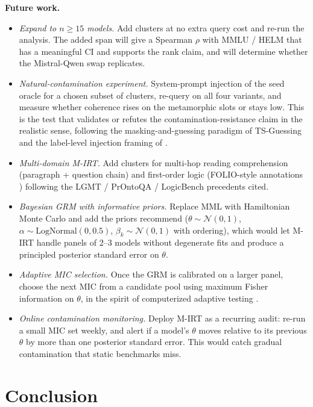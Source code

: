 \documentclass[11pt,letterpaper]{article}
\begin{document}
\textbf{Future work.}
\begin{itemize}
  \item \emph{Expand to $n \geq 15$ models.} Add clusters at no extra query cost and re-run the analysis. The added span will give a Spearman $\rho$ with MMLU / HELM that has a meaningful CI and supports the rank claim, and will determine whether the Mistral-Qwen swap replicates.
  \item \emph{Natural-contamination experiment.} System-prompt injection of the seed oracle for a chosen subset of clusters, re-query on all four variants, and measure whether coherence rises on the metamorphic slots or stays low. This is the test that validates or refutes the contamination-resistance claim in the realistic sense, following the masking-and-guessing paradigm of TS-Guessing \citep{Deng2023} and the label-level injection framing of \citet{Xu2024}.
  \item \emph{Multi-domain M-IRT.} Add clusters for multi-hop reading comprehension (paragraph + question chain) and first-order logic (FOLIO-style annotations \citep{Han2022}) following the LGMT / PrOntoQA / LogicBench precedents cited.
  \item \emph{Bayesian GRM with informative priors.} Replace MML with Hamiltonian Monte Carlo and add the priors \citet{Choi2026} recommend ($\theta \sim \mathcal{N}(0, 1)$, $\alpha \sim \mathrm{LogNormal}(0, 0.5)$, $\beta_k \sim \mathcal{N}(0, 1)$ with ordering), which would let M-IRT handle panels of 2–3 models without degenerate fits and produce a principled posterior standard error on $\theta$.
  \item \emph{Adaptive MIC selection.} Once the GRM is calibrated on a larger panel, choose the next MIC from a candidate pool using maximum Fisher information on $\theta$, in the spirit of computerized adaptive testing \citep{Li2025}.
  \item \emph{Online contamination monitoring.} Deploy M-IRT as a recurring audit: re-run a small MIC set weekly, and alert if a model's $\theta$ moves relative to its previous $\theta$ by more than one posterior standard error. This would catch gradual contamination that static benchmarks miss.
\end{itemize}

\section{Conclusion}
\end{document}
